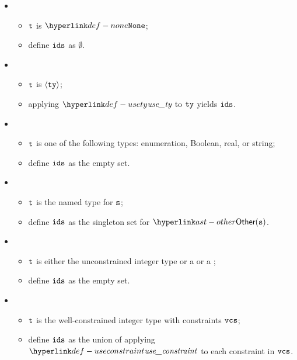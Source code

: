 \ProseParagraph
\OneApplies
\begin{itemize}
  \item {}
  \begin{itemize}
    \item $\texttt{t}$ is $\None$;
    \item define $\texttt{ids}$ as $\emptyset$.
  \end{itemize}

  \item {}
  \begin{itemize}
    \item $\texttt{t}$ is $\langle\texttt{ty}\rangle$;
    \item applying $\usety$ to $\texttt{ty}$ yields $\texttt{ids}$.
  \end{itemize}

  \item {}
  \begin{itemize}
    \item $\texttt{t}$ is one of the following types: enumeration, Boolean, real, or string;
    \item define $\texttt{ids}$ as the empty set.
  \end{itemize}

  \item {}
  \begin{itemize}
    \item $\texttt{t}$ is the named type for $\texttt{s}$;
    \item define $\texttt{ids}$ as the singleton set for $\Other(\vs)$.
  \end{itemize}

  \item {}
  \begin{itemize}
    \item $\texttt{t}$ is either the unconstrained integer type or a \parameterizedintegertype{} or a \pendingconstrainedintegertype;
    \item define $\texttt{ids}$ as the empty set.
  \end{itemize}

  \item {}
  \begin{itemize}
    \item $\texttt{t}$ is the well-constrained integer type with constraints $\texttt{vcs}$;
    \item define $\texttt{ids}$ as the union of applying $\useconstraint$ to each constraint in $\texttt{vcs}$.
  \end{itemize}


\end{itemize}
